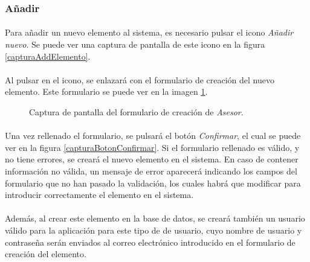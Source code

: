 \subsubsection{Añadir}\label{addAsesor}

  \paragraph{}Para añadir un nuevo elemento al sistema, es necesario pulsar el
  icono \textit{Añadir nuevo}. Se puede ver una captura de pantalla de este
  icono en la figura \ref{capturaAddElemento}.

  \paragraph{}Al pulsar en el icono, se enlazará con el formulario de creación
  del nuevo elemento. Este formulario se puede ver en la imagen
  \ref{capturaAddAsesor}.

  \begin{figure}[!ht]
    \begin{center}
      \caption{Captura de pantalla del formulario de creación de \textit{Asesor}.}
      \label{capturaAddAsesor}
    \end{center}
  \end{figure}

  \paragraph{}Una vez rellenado el formulario, se pulsará el botón
  \textit{Confirmar}, el cual se puede ver en la figura
  \ref{capturaBotonConfirmar}. Si el formulario rellenado es válido, y no tiene
  errores, se creará el nuevo elemento en el sistema. En caso de contener
  información no válida, un mensaje de error aparecerá indicando los campos
  del formulario que no han pasado la validación, los cuales habrá que modificar
  para introducir correctamente el elemento en el sistema.

  \paragraph{}Además, al crear este elemento en la base de datos, se creará
  también un usuario válido para la aplicación para este tipo de de usuario,
  cuyo nombre de usuario y contraseña serán enviados al correo electrónico
  introducido en el formulario de creación del elemento.
